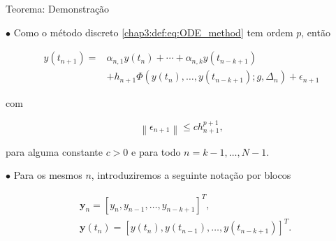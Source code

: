 \documentclass{beamer}
\theoremstyle{plain}
\theoremstyle{definition}
\begin{document}
\begin{frame}{Teorema: Demonstração}
    \small

    \phantom{aa} $\bullet$ Como o método discreto \eqref{chap3:def:eq:ODE_method} tem ordem $p$, então 

    
    \begin{equation}
      \begin{aligned}
        y\left(t_{n+1}\right)= & \alpha_{n, 1} y\left(t_{n}\right)+\cdots+\alpha_{n, k} y\left(t_{n-k+1}\right) \\
        & +h_{n+1} \Phi\left(y\left(t_{n}\right), \ldots, y\left(t_{n-k+1}\right) ; g, \Delta_{n}\right)+\epsilon_{n+1} 
      \end{aligned}
      \label{chap3:teo:ODE_methods_convergence:eq:1}
    \end{equation}

    
    com

    \begin{equation}
      \left\|\epsilon_{n+1}\right\| \leq c h_{n+1}^{p+1}, 
      \label{chap3:teo:ODE_methods_convergence:eq:6}
    \end{equation}


    \noindent
    para alguma constante \(c>0\) e para todo \(n=k-1, \ldots, N-1\). 

   \phantom{aa} $\bullet$ Para os mesmos $n$, introduziremos a seguinte notação por blocos

    \begin{equation*}
        \begin{split}
            &\mathbf{y}_{n}=\left[y_{n}, y_{n-1}, \ldots, y_{n-k+1}\right]^{T}, \\
            &\mathbf{y}(t_{n})=[y(t_{n}), y(t_{n-1}), \ldots, y(t_{n-k+1})]^{T}.
        \end{split}
    \end{equation*}

\end{frame}



\end{document}
